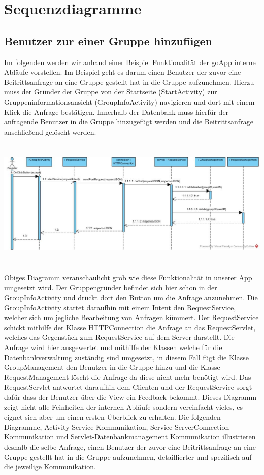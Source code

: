 \section{Sequenzdiagramme}

\subsection{Benutzer zur einer Gruppe hinzufügen}
Im folgenden werden wir anhand einer Beispiel Funktionalität der goApp interne Abläufe vorstellen.
Im Beispiel geht es darum einen Benutzer der zuvor eine Beitrittsanfrage an eine Gruppe gestellt hat in die Gruppe aufzunehmen.
Hierzu muss der Gründer der Gruppe von der Startseite (StartActivity) zur Gruppeninformationsansicht (GroupInfoActivity) navigieren und dort mit einem Klick die Anfrage bestätigen.
Innerhalb der Datenbank muss hierfür der anfragende Benutzer in die Gruppe hinzugefügt werden und die Beitrittsanfrage anschließend gelöscht werden.
\ \\
\ \\
\ \\
\includegraphics[width=1.1\textwidth]{addMemberSequenceDiagram.jpg}
\ \\
\ \\
Obiges Diagramm veranschaulicht grob wie diese Funktionalität in unserer App umgesetzt wird.
Der Gruppengründer befindet sich hier schon in der GroupInfoActivity und drückt dort den Button um die Anfrage anzunehmen.
Die GroupInfoActivity startet daraufhin mit einem Intent den RequestService, welcher sich um jegliche Bearbeitung von Anfragen kümmert.
Der RequestService schickt mithilfe der Klasse HTTPConnection die Anfrage an das RequestServlet, welches das Gegenstück zum RequestService auf dem Server darstellt.
Die Anfrage wird hier ausgewertet und mithilfe der Klassen welche für die Datenbankverwaltung zuständig sind umgesetzt, in diesem Fall fügt die Klasse GroupManagement den Benutzer in die Gruppe hinzu und die Klasse RequestManagement löscht die Anfrage da diese nicht mehr benötigt wird.
Das RequestServlet antwortet daraufhin dem Clienten und der RequestService sorgt dafür dass der Benutzer über die View ein Feedback bekommt. \newline
Dieses Diagramm zeigt nicht alle Feinheiten der internen Abläufe sondern vereinfacht vieles, es eignet sich aber um einen ersten Überblick zu erhalten.
Die folgenden Diagramme, Activity-Service Kommunikation, Service-ServerConnection Kommunikation und Servlet-Datenbankmanagement Kommunikation illustrieren deshalb die selbe Anfrage, einen Benutzer der zuvor eine Beitrittsanfrage an eine Gruppe gestellt hat in die Gruppe aufzunehmen, detaillierter und spezifisch auf die jeweilige Kommunikation.

